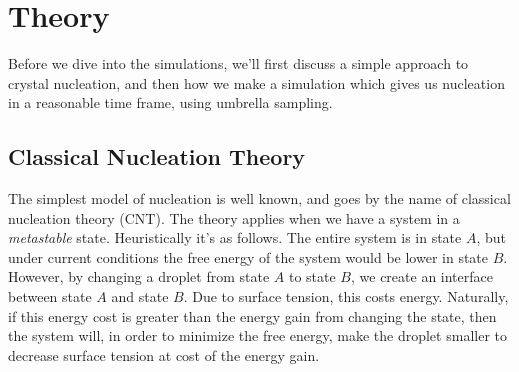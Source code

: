 \documentclass[thesis]{subfiles}
\begin{document}
\section{Theory}

Before we dive into the simulations, we'll first discuss a simple approach to crystal nucleation, and then how we make a simulation which gives us nucleation in a reasonable time frame, using umbrella sampling.

\subsection{Classical Nucleation Theory}

The simplest model of nucleation is well known, and goes by the name of classical nucleation theory (CNT). The theory applies when we have a system in a \emph{metastable} state. Heuristically it's as follows. The entire system is in state $A$, but under current conditions the free energy of the system would be lower in state $B$. However, by changing a droplet from state $A$ to state $B$, we create an interface between state $A$ and state $B$. Due to surface tension, this costs energy. Naturally, if this energy cost is greater than the energy gain from changing the state, then the system will, in order to minimize the free energy, make the droplet smaller to decrease surface tension at cost of the energy gain.
\end{document}
